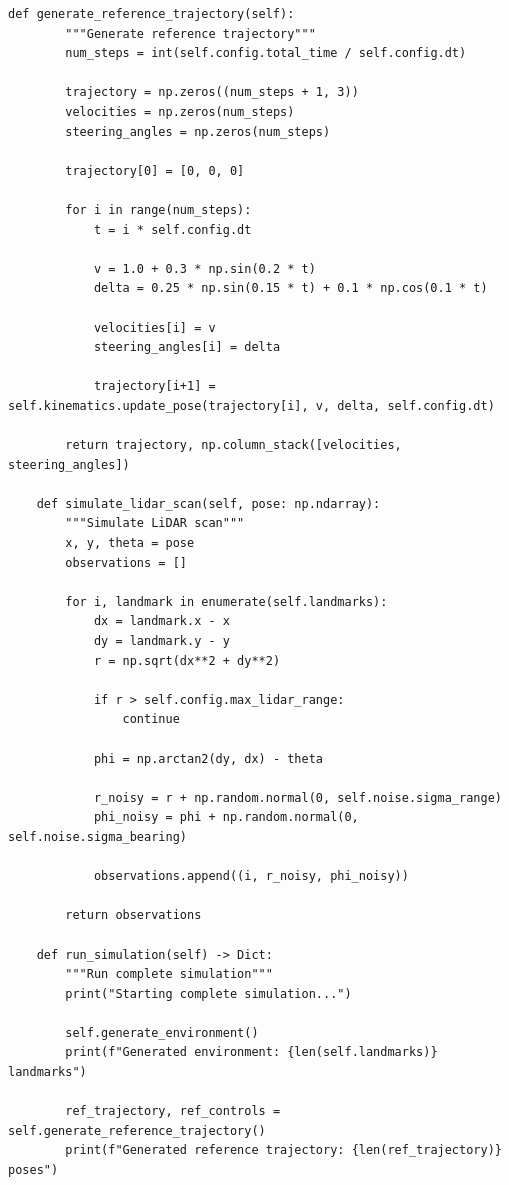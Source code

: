 \documentclass[12pt,a4paper]{report}
\begin{document}
\begin{lstlisting}[caption={Complete Simulation System (complete\_simulation.py)}]
    def generate_reference_trajectory(self):
        """Generate reference trajectory"""
        num_steps = int(self.config.total_time / self.config.dt)
        
        trajectory = np.zeros((num_steps + 1, 3))
        velocities = np.zeros(num_steps)
        steering_angles = np.zeros(num_steps)
        
        trajectory[0] = [0, 0, 0]
        
        for i in range(num_steps):
            t = i * self.config.dt
            
            v = 1.0 + 0.3 * np.sin(0.2 * t)
            delta = 0.25 * np.sin(0.15 * t) + 0.1 * np.cos(0.1 * t)
            
            velocities[i] = v
            steering_angles[i] = delta
            
            trajectory[i+1] = self.kinematics.update_pose(trajectory[i], v, delta, self.config.dt)
        
        return trajectory, np.column_stack([velocities, steering_angles])
    
    def simulate_lidar_scan(self, pose: np.ndarray):
        """Simulate LiDAR scan"""
        x, y, theta = pose
        observations = []
        
        for i, landmark in enumerate(self.landmarks):
            dx = landmark.x - x
            dy = landmark.y - y
            r = np.sqrt(dx**2 + dy**2)
            
            if r > self.config.max_lidar_range:
                continue
            
            phi = np.arctan2(dy, dx) - theta
            
            r_noisy = r + np.random.normal(0, self.noise.sigma_range)
            phi_noisy = phi + np.random.normal(0, self.noise.sigma_bearing)
            
            observations.append((i, r_noisy, phi_noisy))
        
        return observations
    
    def run_simulation(self) -> Dict:
        """Run complete simulation"""
        print("Starting complete simulation...")
        
        self.generate_environment()
        print(f"Generated environment: {len(self.landmarks)} landmarks")
        
        ref_trajectory, ref_controls = self.generate_reference_trajectory()
        print(f"Generated reference trajectory: {len(ref_trajectory)} poses")
        

\end{lstlisting}
\end{document}
